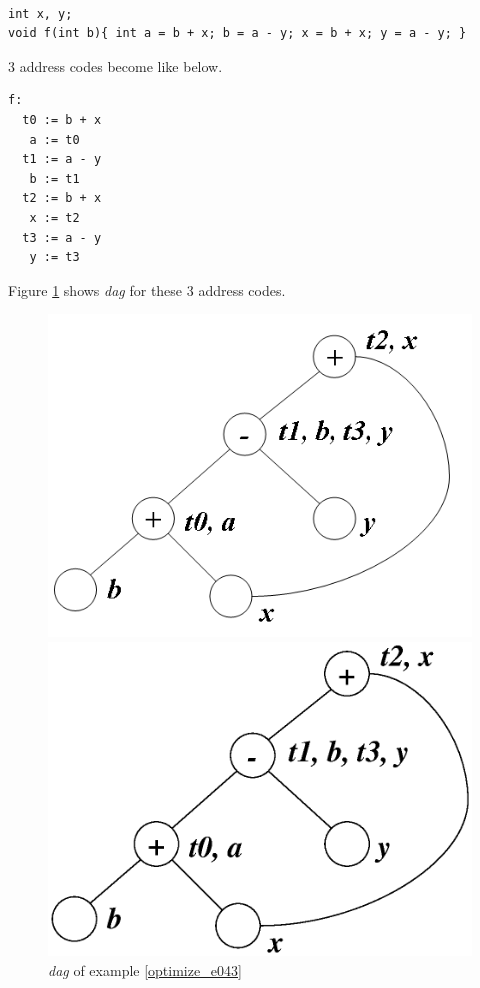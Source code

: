 \begin{Example}
\label{optimize_e043}
\begin{verbatim}

int x, y;
void f(int b){ int a = b + x; b = a - y; x = b + x; y = a - y; }
\end{verbatim}
3 address codes become like below.
\begin{verbatim}
f:
  t0 := b + x
   a := t0
  t1 := a - y
   b := t1
  t2 := b + x
   x := t2
  t3 := a - y
   y := t3
\end{verbatim}
Figure \ref{optimize_e044} shows {\em dag} for these 3 address codes.
\begin{figure}[htbp]
\begin{center}
\begin{htmlonly}
\includegraphics[width=0.7\linewidth,height=0.540\linewidth]{opt023.png}
\end{htmlonly}
\begin{latexonly}
\includegraphics[width=0.7\linewidth,height=0.540\linewidth]{opt023.eps}
\end{latexonly}
\caption{{\em dag} of example \ref{optimize_e043}}
\label{optimize_e044}
\end{center}

\end{figure}
\end{Example}
